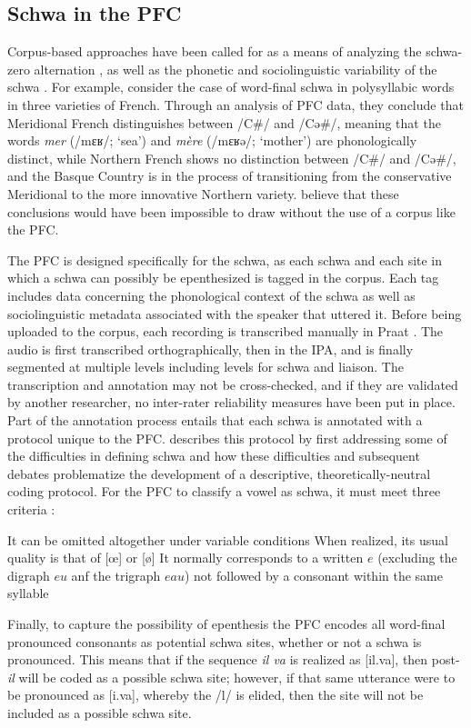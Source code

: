 \documentclass[output=paper,colorlinks,citecolor=brown,
]{langscibook}
\begin{document}
\subsection{Schwa in the PFC}
\label{sec:griffiths:schwa.pfc}
Corpus-based approaches have been called for as a means of analyzing the schwa-zero alternation  \citep{durand7,eychenne}, as well as the phonetic and sociolinguistic variability of the schwa \citep{lyche}. For example, \citet{durand} consider the case of word-final schwa in polysyllabic words in three varieties of French. Through an analysis of PFC data, they conclude that Meridional French distinguishes between /C\#/ and /Cə\#/, meaning that the words \textit{mer} (/mɛʁ/; `sea') and \textit{m\`ere} (/mɛʁə/; `mother') are phonologically distinct, while Northern French shows no distinction between /C\#/ and /Cə\#/, and the Basque Country is in the process of transitioning from the conservative Meridional to the more innovative Northern variety. \citeauthor{durand} believe that these conclusions would have been impossible to draw without the use of a corpus like the PFC. 

The PFC is designed specifically for the schwa, as each schwa and each site in which a schwa can possibly be epenthesized is tagged in the corpus. Each tag includes data concerning the phonological context of the schwa  as well as sociolinguistic metadata associated with the speaker that uttered it. Before being uploaded to the corpus, each recording is transcribed manually in Praat \citep{praat}. The audio is first transcribed orthographically, then in the IPA, and is finally segmented at multiple levels including levels for schwa and liaison. The transcription and annotation may not be cross-checked, and if they are validated by another researcher, no inter-rater reliability measures have been put in place. Part of the annotation process entails that each schwa is annotated with a protocol unique to the PFC. \citet{lyche} describes this protocol by first addressing some of the difficulties in defining schwa and how these difficulties and subsequent debates problematize the development of a descriptive, theoretically-neutral coding protocol.  For the PFC to classify a vowel as schwa, it must meet three criteria \citep[352]{lyche}:
\begin{enumerate}
\ex\label{ex:griffiths:2crit} It can be omitted altogether under variable conditions
\ex\label{ex:griffiths:2crit2} When realized, its usual quality is that of [\oe] or [\o]
\ex\label{ex:griffiths:2crit3} It normally corresponds to a written $e$ (excluding the digraph $eu$ anf the trigraph $eau$) not followed by a consonant within the same syllable
\end{enumerate}
Finally, to capture the possibility of epenthesis the PFC encodes all word-final pronounced consonants as potential schwa sites, whether or not a schwa is pronounced. This means that if the sequence \textit{il va} is realized as [il.va], then post-\textit{il} will be coded as a possible schwa site; however, if that same utterance were to be pronounced as [i.va], whereby the /l/ is elided, then the site will not be included as a possible schwa site.
\end{document}
